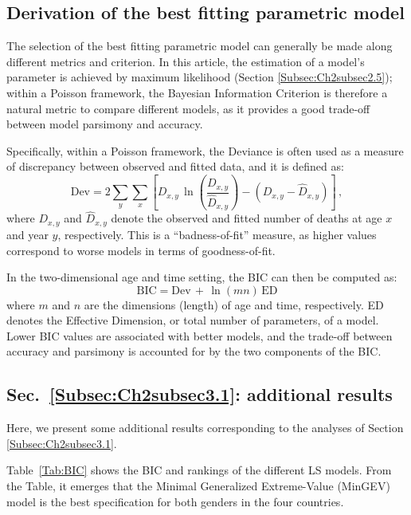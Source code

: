 \documentclass[Thesis]{subfiles}
\begin{document}
\subsection{Derivation of the best fitting parametric model}\label{Subsec:Ch2appC}

The selection of the best fitting parametric model can generally be made along different metrics and criterion. In this article, the estimation of a model's parameter is achieved by maximum likelihood (Section \ref{Subsec:Ch2subsec2.5}); within a Poisson framework, the Bayesian Information Criterion
\citep[BIC,][]{schwarz1978estimating} is therefore a natural metric to compare different models, as it provides a good
trade-off between model parsimony and accuracy.  

Specifically, within a Poisson framework, the Deviance is often
used as a measure of discrepancy between observed and fitted
data, and it is defined as:   
\begin{equation}\label{Dev}
\mathrm{Dev}= 2 \sum_{y} \sum_{x} \left[D_{x,y} \, \ln \left( \frac{D_{x,y}}{\hat{D}_{x,y}}  \right) - (D_{x,y} - \hat{D}_{x,y} )\right] \, ,
\end{equation}
where $D_{x,y}$ and $\hat{D}_{x,y}$ denote the observed and fitted number of deaths at age $x$ and year $y$, respectively. This is a ``badness-of-fit'' measure, as higher values correspond to worse models in terms of goodness-of-fit. 

In the two-dimensional age and time setting, the BIC can then be
computed as: 
\begin{equation}\label{BIC}
\mathrm{BIC}=\mathrm{Dev} \, + \, \ln(m n) \, \mathrm{ED}
\end{equation}
where $m$ and $n$ are the dimensions (length) of age and time,
respectively. ED denotes the Effective Dimension, or total number
of parameters, of a model. Lower BIC values are associated with better models, and the trade-off between accuracy and parsimony is accounted for by the two components of the BIC. 

\subsection{Sec.~\ref{Subsec:Ch2subsec3.1}: additional results}\label{Subsec:Ch2appD}

Here, we present some additional results corresponding to the analyses of Section \ref{Subsec:Ch2subsec3.1}.

Table~\ref{Tab:BIC} shows the BIC and rankings of the different LS models. From the Table, it emerges that the Minimal Generalized Extreme-Value (MinGEV) model is the best specification for both genders in the four countries.
\end{document}
